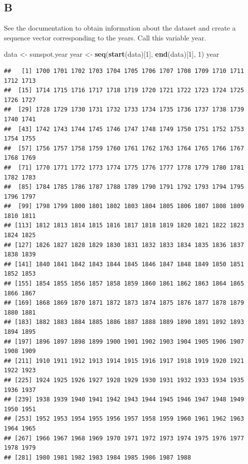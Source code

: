 \documentclass[
]{article}
\newenvironment{Shaded}{\begin{snugshade}}{\end{snugshade}}
\newcommand{\DecValTok}[1]{\textcolor[rgb]{0.00,0.00,0.81}{#1}}
\newcommand{\FunctionTok}[1]{\textcolor[rgb]{0.13,0.29,0.53}{\textbf{#1}}}
\newcommand{\NormalTok}[1]{#1}
\newcommand{\OtherTok}[1]{\textcolor[rgb]{0.56,0.35,0.01}{#1}}
\begin{document}
\hypertarget{b}{%
\subsection{B}\label{b}}

See the documentation to obtain information about the dataset and create
a sequence vector corresponding to the years. Call this variable year.

\begin{Shaded}
\begin{Highlighting}[]
\NormalTok{data }\OtherTok{\textless{}{-}}\NormalTok{ sunspot.year}
\NormalTok{year }\OtherTok{\textless{}{-}} \FunctionTok{seq}\NormalTok{(}\FunctionTok{start}\NormalTok{(data)[}\DecValTok{1}\NormalTok{], }\FunctionTok{end}\NormalTok{(data)[}\DecValTok{1}\NormalTok{], }\DecValTok{1}\NormalTok{)}
\NormalTok{year}
\end{Highlighting}
\end{Shaded}

\begin{verbatim}
##   [1] 1700 1701 1702 1703 1704 1705 1706 1707 1708 1709 1710 1711 1712 1713
##  [15] 1714 1715 1716 1717 1718 1719 1720 1721 1722 1723 1724 1725 1726 1727
##  [29] 1728 1729 1730 1731 1732 1733 1734 1735 1736 1737 1738 1739 1740 1741
##  [43] 1742 1743 1744 1745 1746 1747 1748 1749 1750 1751 1752 1753 1754 1755
##  [57] 1756 1757 1758 1759 1760 1761 1762 1763 1764 1765 1766 1767 1768 1769
##  [71] 1770 1771 1772 1773 1774 1775 1776 1777 1778 1779 1780 1781 1782 1783
##  [85] 1784 1785 1786 1787 1788 1789 1790 1791 1792 1793 1794 1795 1796 1797
##  [99] 1798 1799 1800 1801 1802 1803 1804 1805 1806 1807 1808 1809 1810 1811
## [113] 1812 1813 1814 1815 1816 1817 1818 1819 1820 1821 1822 1823 1824 1825
## [127] 1826 1827 1828 1829 1830 1831 1832 1833 1834 1835 1836 1837 1838 1839
## [141] 1840 1841 1842 1843 1844 1845 1846 1847 1848 1849 1850 1851 1852 1853
## [155] 1854 1855 1856 1857 1858 1859 1860 1861 1862 1863 1864 1865 1866 1867
## [169] 1868 1869 1870 1871 1872 1873 1874 1875 1876 1877 1878 1879 1880 1881
## [183] 1882 1883 1884 1885 1886 1887 1888 1889 1890 1891 1892 1893 1894 1895
## [197] 1896 1897 1898 1899 1900 1901 1902 1903 1904 1905 1906 1907 1908 1909
## [211] 1910 1911 1912 1913 1914 1915 1916 1917 1918 1919 1920 1921 1922 1923
## [225] 1924 1925 1926 1927 1928 1929 1930 1931 1932 1933 1934 1935 1936 1937
## [239] 1938 1939 1940 1941 1942 1943 1944 1945 1946 1947 1948 1949 1950 1951
## [253] 1952 1953 1954 1955 1956 1957 1958 1959 1960 1961 1962 1963 1964 1965
## [267] 1966 1967 1968 1969 1970 1971 1972 1973 1974 1975 1976 1977 1978 1979
## [281] 1980 1981 1982 1983 1984 1985 1986 1987 1988
\end{verbatim}
\end{document}
